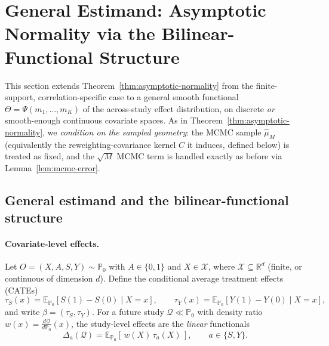 
\section{General Estimand: Asymptotic Normality via the Bilinear-Functional Structure}
\label{sec:general-theory}

This section extends Theorem~\ref{thm:asymptotic-normality} from the finite-support,
correlation-specific case to a general smooth functional $\Theta = \Psi(m_1,\dots,m_K)$
of the across-study effect distribution, on discrete \emph{or} smooth-enough continuous
covariate spaces. As in Theorem~\ref{thm:asymptotic-normality}, we \emph{condition on the
sampled geometry}: the MCMC sample $\hat{\mu}_M$ (equivalently the reweighting-covariance
kernel $C$ it induces, defined below) is treated as fixed, and the $\sqrt{M}$ MCMC term is
handled exactly as before via Lemma~\ref{lem:mcmc-error}.

\subsection{General estimand and the bilinear-functional structure}
\label{subsec:bilinear-structure}

\paragraph{Covariate-level effects.}
Let $O=(X,A,S,Y)\sim\mathbb{P}_0$ with $A\in\{0,1\}$ and $X\in\mathcal{X}$, where
$\mathcal{X}\subseteq\mathbb{R}^d$ (finite, or continuous of dimension $d$). Define the
conditional average treatment effects (CATEs)
\begin{equation}
\tau_S(x) = \mathbb{E}_{\mathbb{P}_0}[S(1)-S(0)\mid X=x],
\qquad
\tau_Y(x) = \mathbb{E}_{\mathbb{P}_0}[Y(1)-Y(0)\mid X=x],
\end{equation}
and write $\beta=(\tau_S,\tau_Y)$. For a future study $\mathcal{Q}\ll\mathbb{P}_0$ with
density ratio $w(x)=\tfrac{d\mathcal{Q}}{d\mathbb{P}_0}(x)$, the study-level effects are the
\emph{linear} functionals
\begin{equation}
\Delta_a(\mathcal{Q}) = \mathbb{E}_{\mathbb{P}_0}[\,w(X)\,\tau_a(X)\,],
\qquad a\in\{S,Y\}.
\label{eq:delta-linear}
\end{equation}


